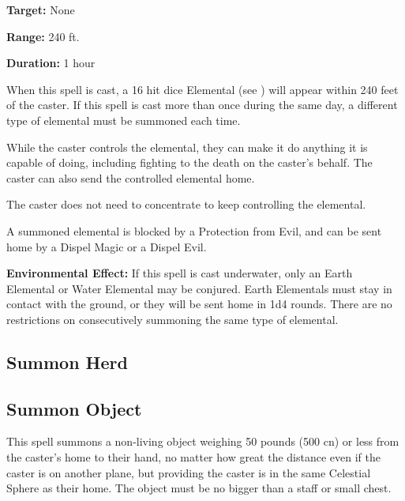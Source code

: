 \begin{multicols*}{2}
{\textbf{Target:} None

\textbf{Range:} 240 ft.

\textbf{Duration:} 1 hour}

When this spell is cast, a 16 hit dice Elemental (see ) will appear within 240 feet of the caster. If this spell is cast more than once during the same day, a different type of elemental must be summoned each time.

While the caster controls the elemental, they can make it do anything it is capable of doing, including fighting to the death on the caster’s behalf. The caster can also send the controlled elemental home.

The caster does not need to concentrate to keep controlling the elemental.

A summoned elemental is blocked by a Protection from Evil, and can be sent home by a Dispel Magic or a Dispel Evil.

\textbf{Environmental Effect:} If this spell is cast underwater, only an Earth Elemental or Water Elemental may be conjured. Earth Elementals must stay in contact with the ground, or they will be sent home in 1d4 rounds. There are no restrictions on consecutively summoning the same type of elemental.

\subsection{Summon Herd}\label{spell:Summon Herd}



\subsection{Summon Object}\label{spell:Summon Object}

This spell summons a non-living object weighing 50 pounds (500 cn) or less from the caster’s home to their hand, no matter how great the distance even if the caster is on another plane, but providing the caster is in the same Celestial Sphere as their home. The object must be no bigger than a staff or small chest.


\end{multicols*}
